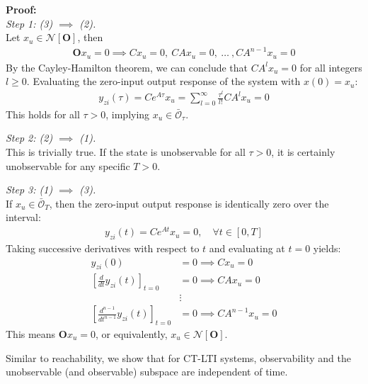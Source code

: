 \documentclass[twoside]{article}
\begin{document}
\textbf{Proof:} \\
\textit{Step 1: (3) $\implies$ (2).}\\ 
Let $x_u \in \mathcal{N}[ \mathbf{O} ]$, then  
%
\begin{align*}
  \mathbf{O} x_u = 0 \implies C x_u = 0, \ C A x_u = 0, \ \dots \ , C A^{n-1} x_u = 0
\end{align*}
%
By the Cayley-Hamilton theorem, we can conclude that $C A^{l} x_u = 0$ for all integers $l \ge 0$. 
Evaluating the zero-input output response of the system with $x(0) = x_u$:
%
\begin{align*}
  y_{zi}(\tau) = C e^{A \tau} x_u = \sum_{l=0}^{\infty} \frac{\tau^l}{l!} C A^l x_u = 0
\end{align*}
%
This holds for all $\tau > 0$, implying $x_u \in \bar{\mathcal{O}}_{\tau}$.

\textit{Step 2: (2) $\implies$ (1).}\\ 
This is trivially true. If the state is unobservable for all $\tau > 0$, it is certainly unobservable for any specific $T > 0$.

\textit{Step 3: (1) $\implies$ (3).}\\ 
If $x_u \in \bar{\mathcal{O}}_T$, then the zero-input output response is identically zero over the interval:
%
\begin{align*}
  y_{zi}(t) = C e^{A t} x_u = 0 , \quad \forall t \in [0,T]
\end{align*}
Taking successive derivatives with respect to $t$ and evaluating at $t=0$ yields:
\begin{align*} 
  y_{zi}(0) &= 0 \implies C x_u = 0 \\
  \left[\frac{d}{dt}y_{zi}(t) \right]_{t=0} &= 0 \implies C A x_u = 0 \\
  &\vdots \\
  \left[\frac{d^{n-1}}{dt^{n-1}}y_{zi}(t) \right]_{t=0} &= 0 \implies C A^{n-1} x_u = 0
\end{align*}
This means $\mathbf{O} x_u = 0$, or equivalently, $x_u \in \mathcal{N}[ \mathbf{O} ]$.

Similar to reachability, we show that for CT-LTI systems,
observability and the unobservable (and observable) subspace
are independent of time. 
\end{document}
